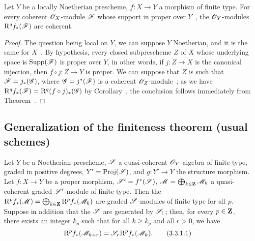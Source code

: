 \begin{corollary}[3.2.4]
\label{3.3.2.4}
Let $Y$ be a locally Noetherian prescheme, $f:X\to Y$ a morphism of finite type.
For every coherent $\mathscr{O}_X$-module $\mathscr{F}$ whose support in proper over $Y$~, the $\mathscr{O}_Y$-modules $\mathrm{R}^q f_*(\mathscr{F})$ are coherent.
\end{corollary}

\begin{proof}
\label{proof-3.3.2.4}
The question being local on $Y$, we can suppose $Y$ Noetherian, and it is the same for $X$~.
By hypothesis, every closed subprescheme $Z$ of $X$ whose underlying space is $\operatorname{Supp}(\mathscr{F})$ is proper over $Y$, in other words, if $j:Z\to X$ is the canonical injection, then $f\circ j:Z\to Y$ is proper.
We can suppose that $Z$ is such that $\mathscr{F}=j_*(\mathscr{G})$, where $\mathscr{G}=j^*(\mathscr{F})$ is a coherent $\mathscr{O}_Z$-module~; as we have $\mathrm{R}^q f_*(\mathscr{F})=\mathrm{R}^q(f\circ j)_*(\mathscr{G})$ by Corollary~, the conclusion follows immediately from Theorem~.
\end{proof}

\subsection{Generalization of the finiteness theorem (usual schemes)}
\label{subsection:3.3.3}

\begin{proposition}[3.3.1]
\label{3.3.3.1}
Let $Y$ be a Noetherian prescheme, $\mathscr{S}$ a quasi-coherent $\mathscr{O}_Y$-algebra of finite type, graded in positive degrees, $Y'=\operatorname{Proj}(\mathscr{S})$, and $g:Y'\to Y$ the structure morphism.
Let $f:X\to Y$ be a proper morphism, $\mathscr{S}'=f^*(\mathscr{S})$, $\mathscr{M}=\bigoplus_{k\in\mathbf{Z}}\mathscr{M}_k$ a quasi-coherent graded $\mathscr{S}'$-module of finite type.
Then the $\mathrm{R}^p f_*(\mathscr{M})=\bigoplus_{k\in\mathbf{Z}}\mathrm{R}^p f_*(\mathscr{M}_k)$ are graded $\mathscr{S}$-modules of finite type for all $p$.
Suppose in addition that the $\mathscr{S}$ are generated by $\mathscr{S}_1$; then, for every $p\in\mathbf{Z}$, there exists an integer $k_p$ such that for all $k\geq k_p$ and all $r>0$, we have
\[
\label{3.3.3.1.1}
  \mathrm{R}^p f_*(\mathscr{M}_{k+r})=\mathscr{S}_r\mathrm{R}^p f_*(\mathscr{M}_k).
  \tag{3.3.1.1}
\] 
\end{proposition}

